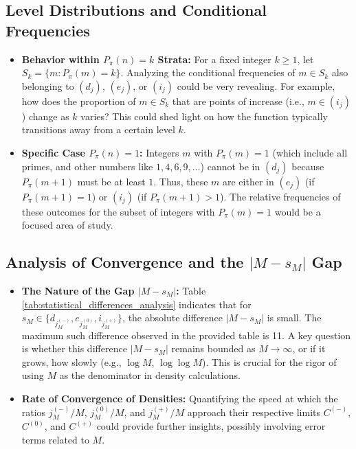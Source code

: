 \documentclass[]{article}
\theoremstyle{plain}%
\theoremstyle{definition}
\theoremstyle{remark}
\begin{document}
	\subsection{Level Distributions and Conditional Frequencies}
	\begin{itemize}
		\item \textbf{Behavior within $P_{\pi}(n)=k$ Strata:} For a fixed integer $k \ge 1$, let $S_k = \{ m : P_{\pi}(m) = k \}$. Analyzing the conditional frequencies of $m \in S_k$ also belonging to $(d_j)$, $(e_j)$, or $(i_j)$ could be very revealing. For example, how does the proportion of $m \in S_k$ that are points of increase (i.e., $m \in (i_j)$) change as $k$ varies? This could shed light on how the function typically transitions away from a certain level $k$.
		\item \textbf{Specific Case $P_{\pi}(n)=1$:} Integers $m$ with $P_{\pi}(m)=1$ (which include all primes, and other numbers like $1, 4, 6, 9, \dots$) cannot be in $(d_j)$ because $P_{\pi}(m+1)$ must be at least $1$. Thus, these $m$ are either in $(e_j)$ (if $P_{\pi}(m+1)=1$) or $(i_j)$ (if $P_{\pi}(m+1)>1$). The relative frequencies of these outcomes for the subset of integers with $P_{\pi}(m)=1$ would be a focused area of study.
	\end{itemize}
	
	\subsection{Analysis of Convergence and the $|M-s_M|$ Gap}
	\begin{itemize}
		\item \textbf{The Nature of the Gap $|M-s_M|$:} Table \ref{tab:statistical_differences_analysis} indicates that for $s_M \in \{d_{j^{(-)}_M}, e_{j^{(0)}_M}, i_{j^{(+)}_M}\}$, the absolute difference $|M-s_M|$ is small. The maximum such difference observed in the provided table is 11. A key question is whether this difference $|M-s_M|$ remains bounded as $M \to \infty$, or if it grows, how slowly (e.g., $\log M$, $\log \log M$). This is crucial for the rigor of using $M$ as the denominator in density calculations.
		\item \textbf{Rate of Convergence of Densities:} Quantifying the speed at which the ratios $j^{(-)}_M/M$, $j^{(0)}_M/M$, and $j^{(+)}_M/M$ approach their respective limits $C^{(-)}$, $C^{(0)}$, and $C^{(+)}$ could provide further insights, possibly involving error terms related to $M$.
	\end{itemize}
	
\end{document}

